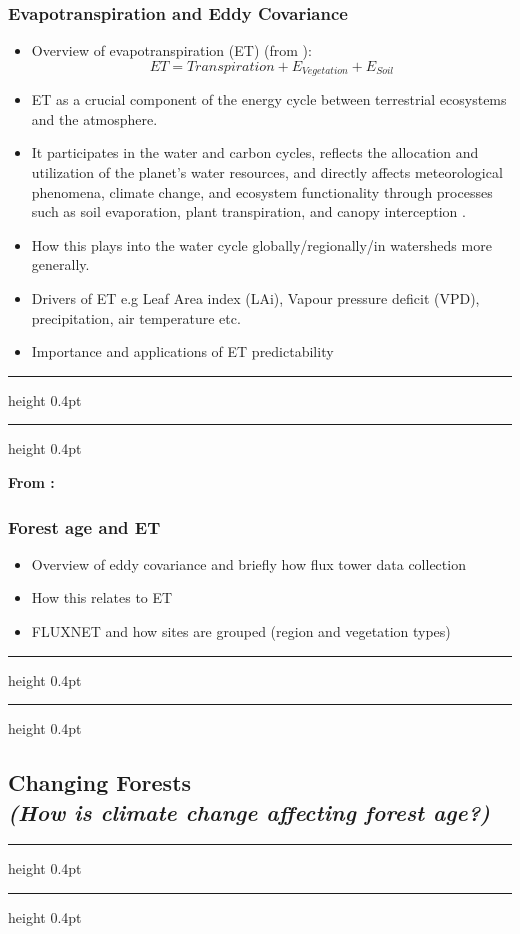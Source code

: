 \documentclass[paper=a4, fontsize=12pt]{scrartcl}
\newcommand{\notedivider}{%
	\vspace{4pt}%
	{\hrule height 0.4pt}%
	\vspace{6pt}%
	{\hrule height 0.4pt}
	\vspace{6pt}
}
\begin{document}
	\subsubsection{Evapotranspiration and Eddy Covariance} 
	\begin{itemize}
		\item Overview of evapotranspiration (ET) (from \citep{wang2012review}):
		\begin{equation}
			ET = Transpiration + E_{Vegetation} + E_{Soil}
		\end{equation}
		\item ET as a crucial component of the energy cycle between terrestrial ecosystems and the atmosphere.
		\item It participates in the water and carbon cycles, reflects the allocation and utilization of the planet’s water resources, and directly affects meteorological phenomena, climate change, and ecosystem functionality through processes such as soil evaporation, plant transpiration, and canopy interception \citep{xue2025review}.
		\item How this plays into the water cycle globally/regionally/in watersheds more generally.
		\item Drivers of ET e.g Leaf Area index (LAi), Vapour pressure deficit (VPD), precipitation, air temperature etc.
		\item Importance and applications of ET predictability
	\end{itemize}
	\notedivider
	\textbf{From \citep{amani2023review}:}
	
	
	
	\newpage
	\subsubsection{Forest age and ET}
	\begin{itemize}
		\item Overview of eddy covariance and briefly how flux tower data collection
		\item How this relates to ET
		\item FLUXNET and how sites are grouped (region and vegetation types)
	\end{itemize}
	\notedivider
	
	\newpage
	\subsection{Changing Forests\\ \textit{(How is climate change affecting forest age?)}} 
	\notedivider
\end{document}
